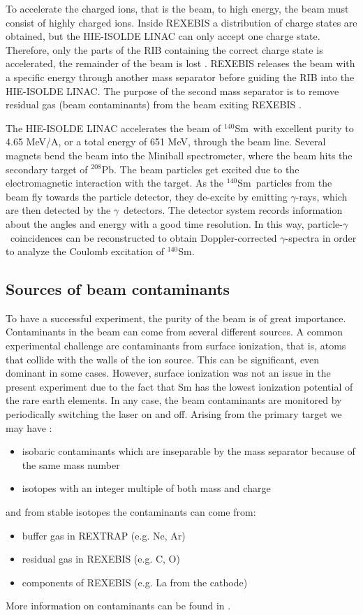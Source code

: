 \documentclass[twoside,english]{uiofysmaster/uiofysmaster}
\newcommand{\Sm}{$^{140}$Sm} %
\newcommand{\Pb}{$^{208}$Pb}
\newcommand{\ga}{$\gamma$}
\let\orgautoref\autoref
\renewcommand{\autoref}
        {%
		 \def\sectionautorefname{Section}%
		 \def\subsectionautorefname{Section}%
		 \def\subsubsectionautorefname{Section}%
		 \def\chapterautorefname{Chapter}%
          \orgautoref}
\begin{document}
To accelerate the charged ions, that is the beam, to high energy, the beam must consist of highly charged ions. 
Inside REXEBIS a distribution of charge states are obtained, but the HIE-ISOLDE LINAC can only accept one charge state.
Therefore, only the parts of the RIB containing the correct charge state is accelerated, the remainder of the beam is lost \cite{REX-web, HIE-web, EBIS2002, EBIS2010}.
REXEBIS releases the beam with a specific energy through another mass separator before guiding the RIB into the HIE-ISOLDE LINAC. 
The purpose of the second mass separator is to remove residual gas (beam contaminants) from the beam exiting REXEBIS \cite{HIE-ISOLDE}. 

The HIE-ISOLDE LINAC accelerates the beam of \Sm\ with excellent purity to 4.65 MeV/A, or a total energy of 651 MeV, through the beam line. 
Several magnets bend the beam into the Miniball spectrometer, where the beam hits the secondary target of \Pb. 
The beam particles get excited due to the electromagnetic interaction with the target.
As the \Sm\ particles from the beam fly towards the particle detector, they de-excite by emitting \ga-rays, which are then detected by the \ga\ detectors.
The detector system records information about the angles and energy with a good time resolution. 
In this way, particle-\ga\ coincidences can be reconstructed to obtain Doppler-corrected \ga-spectra  in order to analyze the Coulomb excitation of \Sm.


\subsection{Sources of beam contaminants}\label{ssec:bcontaminants}
To have a successful experiment, the purity of the beam is of great importance. Contaminants in the beam can come from several different sources. 
A common experimental challenge are contaminants from surface ionization, that is, atoms that collide with the walls of the ion source. 
This can be significant, even dominant in some cases. 
However, surface ionization was not an issue in the present experiment due to the fact that Sm has the lowest ionization potential of the rare earth elements. 
In any case, the beam contaminants are monitored by periodically switching the laser on and off.
Arising from the primary target we may have \cite{MB-spect}:
\begin{itemize}
	\item isobaric contaminants which are inseparable by the mass separator because of the same mass number
	\item isotopes with an integer multiple of both mass and charge
\end{itemize}
and from stable isotopes the contaminants can come from:
\begin{itemize}
	\item buffer gas in REXTRAP (e.g. Ne, Ar)
	\item residual gas in REXEBIS (e.g. C, O)
	\item components of REXEBIS (e.g. La from the cathode)
\end{itemize}
More information on contaminants can be found in \cite{HIE-ISOLDE, RILIS, MB-spect}.
\end{document}
